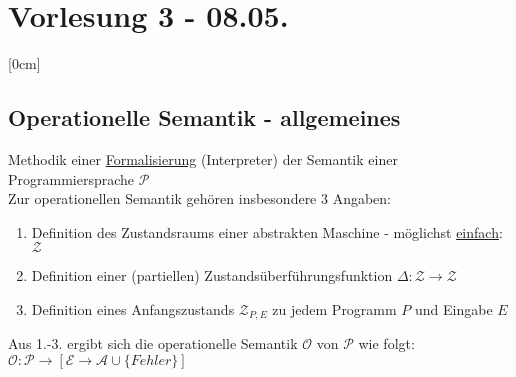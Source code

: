 \section{Vorlesung 3 - 08.05.}
[0cm]
\subsection{Operationelle Semantik - allgemeines}
Methodik einer \underline{Formalisierung} (Interpreter) der Semantik einer Programmiersprache $\mathcal{P}$\\
Zur operationellen Semantik gehören insbesondere 3 Angaben:\\
\begin{enumerate}
	\item Definition des Zustandsraums einer abstrakten Maschine - möglichst \underline{einfach}: $\mathcal{Z}$
	\item Definition einer (partiellen) Zustandsüberführungsfunktion $\Delta:\mathcal{Z}\rightarrow \mathcal{Z}$
	\item Definition eines Anfangszustands $\mathcal{Z}_{P,E}$ zu jedem Programm $P$ und Eingabe $E$
\end{enumerate}
Aus 1.-3. ergibt sich die operationelle Semantik $\mathcal{O}$  von $\mathcal{P}$ wie folgt:\\
$\mathcal{O}:\mathcal{P}\rightarrow[\mathcal{E}\rightarrow \mathcal{A}\cup \{Fehler\}]$\\

